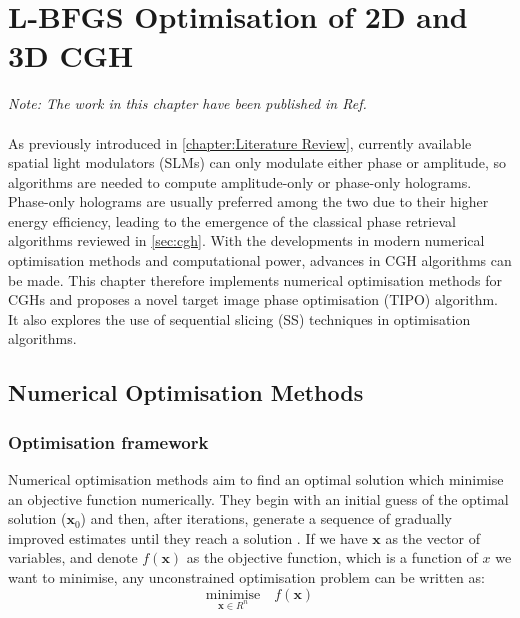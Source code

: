 \chapter{L-BFGS Optimisation of 2D and 3D CGH}
\label{chapter:L-BFGS Optimisation of Phase-Only Hologram}

\graphicspath{{Chapter_Optim_CGH/Figs/}}

\textit{Note: The work in this chapter have been published in Ref. \cite{Sha2022,Sha2023,Sha2025TIPO}}\\\\


As previously introduced in \cref{chapter:Literature Review}, currently available spatial light modulators (SLMs) can only modulate either phase or amplitude, so algorithms are needed to compute amplitude-only or phase-only holograms. Phase-only holograms are usually preferred among the two due to their higher energy efficiency, leading to the emergence of the classical phase retrieval algorithms reviewed in \cref{sec:cgh}. With the developments in modern numerical optimisation methods and computational power, advances in CGH algorithms can be made. This chapter therefore implements numerical optimisation methods for CGHs and proposes a novel target image phase optimisation (TIPO) algorithm. It also explores the use of sequential slicing (SS) techniques in optimisation algorithms.

\section{Numerical Optimisation Methods} \label{sec:Numerical Optimisation Methods}

\subsection{Optimisation framework} \label{sec:Optimisation framework}
Numerical optimisation methods aim to find an optimal solution which minimise an objective function numerically. They begin with an initial guess of the optimal solution ($\textbf{x}_{0}$) and then, after iterations, generate a sequence of gradually improved estimates until they reach a solution \cite{Nocedal2006}. If we have $\textbf{x}$ as the vector of variables, and denote $f(\textbf{x})$ as the objective function, which is a function of $x$ we want to minimise, any unconstrained optimisation problem can be written as:
\begin{equation}
  \underset{\textbf{x}\in R^n}{\text{minimise}}\quad f(\textbf{x})
  \label{eq:minimise_F}
\end{equation}

